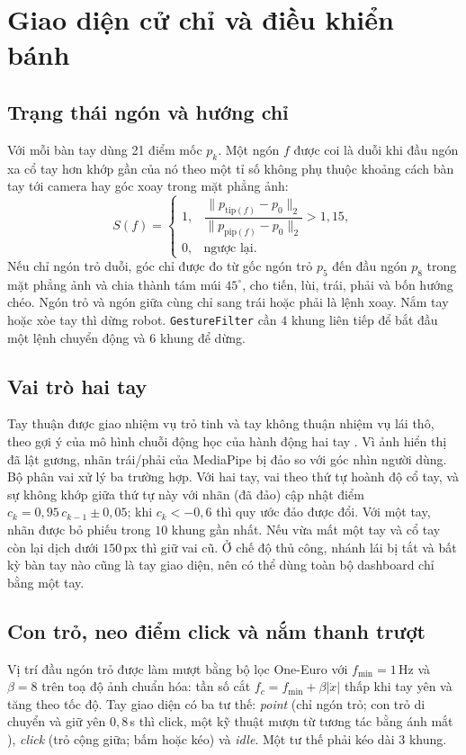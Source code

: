 \documentclass[5p,twocolumn]{elsarticle}
\begin{document}
\section{Giao diện cử chỉ và điều khiển bánh}\label{sec:interface}
\subsection{Trạng thái ngón và hướng chỉ}
Với mỗi bàn tay dùng 21 điểm mốc $p_k$. Một ngón $f$ được coi là duỗi khi đầu ngón xa cổ tay hơn khớp gần của nó theo một tỉ số không phụ thuộc khoảng cách bàn tay tới camera hay góc xoay trong mặt phẳng ảnh:
\begin{equation}
S(f)=\begin{cases}1,&\dfrac{\|p_{\mathrm{tip}(f)}-p_0\|_2}{\|p_{\mathrm{pip}(f)}-p_0\|_2}>1{,}15,\\[6pt] 0,&\text{ngược lại.}\end{cases}
\label{eq:ext}
\end{equation}
Nếu chỉ ngón trỏ duỗi, góc chỉ được đo từ gốc ngón trỏ $p_5$ đến đầu ngón $p_8$ trong mặt phẳng ảnh và chia thành tám múi $45^{\circ}$, cho tiến, lùi, trái, phải và bốn hướng chéo. Ngón trỏ và ngón giữa cùng chỉ sang trái hoặc phải là lệnh xoay. Nắm tay hoặc xòe tay thì dừng robot. \texttt{GestureFilter} cần $4$ khung liên tiếp để bắt đầu một lệnh chuyển động và $6$ khung để dừng.

\subsection{Vai trò hai tay}
Tay thuận được giao nhiệm vụ trỏ tinh và tay không thuận nhiệm vụ lái thô, theo gợi ý của mô hình chuỗi động học của hành động hai tay \cite{guiard1987}. Vì ảnh hiển thị đã lật gương, nhãn trái/phải của MediaPipe bị đảo so với góc nhìn người dùng. Bộ phân vai xử lý ba trường hợp. Với hai tay, vai theo thứ tự hoành độ cổ tay, và sự không khớp giữa thứ tự này với nhãn (đã đảo) cập nhật điểm $c_k=0{,}95\,c_{k-1}\pm0{,}05$; khi $c_k<-0{,}6$ thì quy ước đảo được đổi. Với một tay, nhãn được bỏ phiếu trong $10$ khung gần nhất. Nếu vừa mất một tay và cổ tay còn lại dịch dưới $150$\,px thì giữ vai cũ. Ở chế độ thủ công, nhánh lái bị tắt và bất kỳ bàn tay nào cũng là tay giao diện, nên có thể dùng toàn bộ dashboard chỉ bằng một tay.

\subsection{Con trỏ, neo điểm click và nắm thanh trượt}
Vị trí đầu ngón trỏ được làm mượt bằng bộ lọc One-Euro \cite{casiez2012} với $f_{\min}=1$\,Hz và $\beta=8$ trên toạ độ ảnh chuẩn hóa: tần số cắt $f_c=f_{\min}+\beta|\dot{x}|$ thấp khi tay yên và tăng theo tốc độ. Tay giao diện có ba tư thế: \emph{point} (chỉ ngón trỏ; con trỏ di chuyển và giữ yên $0{,}8$\,s thì click, một kỹ thuật mượn từ tương tác bằng ánh mắt \cite{jacob1991}), \emph{click} (trỏ cộng giữa; bấm hoặc kéo) và \emph{idle}. Một tư thế phải kéo dài $3$ khung.
\end{document}
